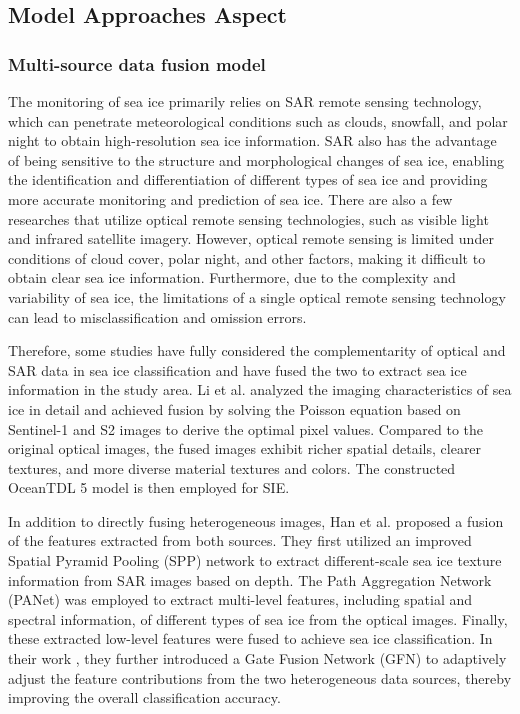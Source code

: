 \subsection{Model Approaches Aspect} 

\subsubsection{Multi-source data fusion model} 
The monitoring of sea ice primarily relies on SAR remote sensing technology, which can penetrate meteorological conditions such as clouds, snowfall, and polar night to obtain high-resolution sea ice information. SAR also has the advantage of being sensitive to the structure and morphological changes of sea ice, enabling the identification and differentiation of different types of sea ice and providing more accurate monitoring and prediction of sea ice. There are also a few researches that utilize optical remote sensing technologies, such as visible light and infrared satellite imagery. However, optical remote sensing is limited under conditions of cloud cover, polar night, and other factors, making it difficult to obtain clear sea ice information. Furthermore, due to the complexity and variability of sea ice, the limitations of a single optical remote sensing technology can lead to misclassification and omission errors.

Therefore, some studies have fully considered the complementarity of optical and SAR data in sea ice classification and have fused the two to extract sea ice information in the study area. Li et al. \cite{87li2021fusion} analyzed the imaging characteristics of sea ice in detail and achieved fusion by solving the Poisson equation based on Sentinel-1 and S2 images to derive the optimal pixel values. Compared to the original optical images, the fused images exhibit richer spatial details, clearer textures, and more diverse material textures and colors. The constructed OceanTDL 5 model is then employed for SIE.

In addition to directly fusing heterogeneous images, Han et al. \cite{88han2021sea} proposed a fusion of the features extracted from both sources. They first utilized an improved Spatial Pyramid Pooling (SPP) network to extract different-scale sea ice texture information from SAR images based on depth. The Path Aggregation Network (PANet) was employed to extract multi-level features, including spatial and spectral information, of different types of sea ice from the optical images. Finally, these extracted low-level features were fused to achieve sea ice classification. In their work \cite{89han2022sea}, they further introduced a Gate Fusion Network (GFN) to adaptively adjust the feature contributions from the two heterogeneous data sources, thereby improving the overall classification accuracy.

